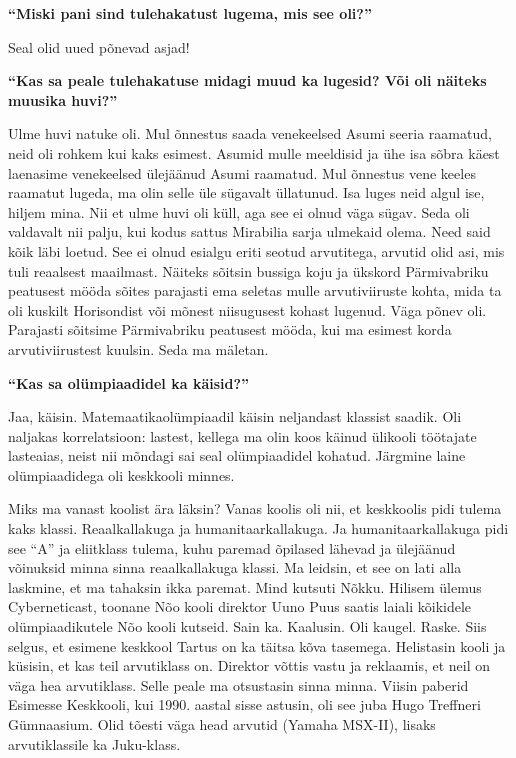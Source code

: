\textbf{\enquote{Miski pani sind tulehakatust lugema, mis see oli?}}

Seal olid uued põnevad asjad!

\textbf{\enquote{Kas sa peale tulehakatuse midagi muud ka lugesid? Või oli näiteks muusika huvi?}}

Ulme huvi natuke oli. Mul õnnestus saada venekeelsed Asumi seeria raamatud, neid oli rohkem kui kaks esimest. Asumid mulle meeldisid ja ühe isa sõbra käest laenasime venekeelsed ülejäänud Asumi raamatud. Mul õnnestus vene keeles raamatut lugeda, ma olin selle üle sügavalt üllatunud. Isa luges neid algul ise, hiljem mina. Nii et ulme huvi oli küll, aga see ei olnud väga sügav. Seda oli valdavalt nii palju, kui kodus sattus Mirabilia sarja ulmekaid olema. Need said kõik läbi loetud. See ei olnud esialgu eriti seotud arvutitega, arvutid olid asi, mis tuli reaalsest maailmast. Näiteks sõitsin bussiga koju ja ükskord Pärmivabriku peatusest mööda sõites parajasti ema seletas mulle arvutiviiruste kohta, mida ta oli kuskilt Horisondist või mõnest niisugusest kohast lugenud. Väga põnev oli. Parajasti sõitsime Pärmivabriku peatusest mööda, kui ma esimest korda arvutiviirustest kuulsin. Seda ma mäletan. 

\textbf{\enquote{Kas sa olümpiaadidel ka käisid?}}

Jaa, käisin. Matemaatikaolümpiaadil käisin neljandast klassist saadik. Oli naljakas korrelatsioon: lastest, kellega ma olin koos käinud ülikooli töötajate lasteaias, neist nii mõndagi sai seal olümpiaadidel kohatud. Järgmine laine olümpiaadidega oli keskkooli minnes. 

Miks ma vanast koolist ära läksin? Vanas koolis oli nii, et keskkoolis pidi tulema kaks klassi. Reaalkallakuga ja humanitaarkallakuga. Ja humanitaarkallakuga pidi see \enquote{A} ja eliitklass tulema, kuhu paremad õpilased lähevad ja ülejäänud võinuksid minna sinna reaalkallakuga klassi. Ma leidsin, et see on lati alla laskmine, et ma tahaksin ikka paremat. Mind kutsuti Nõkku. Hilisem ülemus Cyberneticast, toonane Nõo kooli direktor Uuno Puus saatis laiali kõikidele olümpiaadikutele Nõo kooli kutseid. Sain ka. Kaalusin. Oli kaugel. Raske. Siis selgus, et esimene keskkool Tartus on ka täitsa kõva tasemega. Helistasin kooli ja küsisin, et kas teil arvutiklass on. Direktor võttis vastu ja reklaamis, et neil on väga hea arvutiklass. Selle peale ma otsustasin sinna minna. Viisin paberid Esimesse Keskkooli, kui 1990. aastal sisse astusin, oli see juba Hugo Treffneri Gümnaasium. Olid tõesti väga head arvutid (Yamaha MSX-II), lisaks arvutiklassile ka Juku-klass. 

